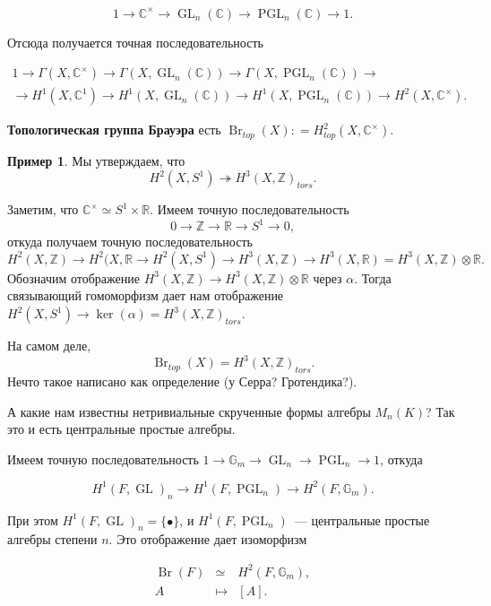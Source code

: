 \documentclass[a4paper]{article}
\DeclareMathOperator{\Br}{Br}
\DeclareMathOperator{\PGL}{PGL}
\DeclareMathOperator{\GL}{GL}
\newcommand{\term}{\textbf}
\newcommand{\dfn}{\mathrel{\mathop:}=}
\newcommand{\isom}{\simeq}
\theoremstyle{definition}
\newtheorem{example}[theorem]{Пример}
\begin{document}
\[ 1 \to \mathbb{C}^\times \to \GL_n (\mathbb{C}) \to \PGL_n (\mathbb{C}) \to 1. \]

Отсюда получается точная последовательность

\begin{gather*}
1 \to \Gamma (X, \mathbb{C}^\times) \to \Gamma (X, \GL_n (\mathbb{C}))
\to \Gamma (X, \PGL_n (\mathbb{C})) \to \\ \to H^1 (X,\mathbb{C}^1)
\to H^1 (X,\GL_n (\mathbb{C})) \to H^1 (X, \PGL_n (\mathbb{C})) \to
H^2 (X, \mathbb{C}^\times).
\end{gather*}

\term{Топологическая группа Брауэра} есть $\Br_{top} (X) \dfn
H^2_{top} (X, \mathbb{C}^\times)$.

\begin{example}
Мы утверждаем, что
\[ H^2 (X, S^1) \twoheadrightarrow H^3 (X, \mathbb{Z})_{tors}. \]

Заметим, что
$\mathbb{C}^\times \isom S^1 \times \mathbb{R}$. Имеем точную
последовательность 
\[ 0 \to \mathbb{Z} \to \mathbb{R} \to S^1 \to 0, \]
откуда получаем точную последовательность
\[ H^2(X,\mathbb{Z})\to H^2(X,\mathbb{R}\to H^2(X,S^1)\to
H^3(X,\mathbb Z)\to H^3(X,\mathbb R)=H^3(X,\mathbb Z)\otimes \mathbb R.\]
Обозначим отображение $H^3(X,\mathbb Z)\to H^3(X,\mathbb
Z)\otimes\mathbb R$ через $\alpha$. Тогда связывающий гомоморфизм
дает нам отображение $H^2(X,S^1)\to\ker(\alpha)=H^3(X,\mathbb Z)_{tors}$.

На самом деле,
\[ \Br_{top} (X) = H^3 (X,\mathbb{Z})_{tors}. \]
Нечто такое написано как определение (у Серра? Гротендика?).
\end{example}

А какие нам известны нетривиальные скрученные формы алгебры $M_n (K)$?
Так это и есть центральные простые алгебры.

Имеем точную последовательность $1 \to \mathbb{G}_m \to \GL_n \to
\PGL_n \to 1$, откуда

\[ H^1 (F,\GL)_n \to H^1 (F, \PGL_n) \to H^2 (F,\mathbb{G}_m). \]

При этом
$H^1 (F,\GL)_n = \{ \bullet \}$, и $H^1 (F, \PGL_n)$~--- центральные
простые алгебры степени $n$. Это отображение дает изоморфизм %

\begin{eqnarray*}
\Br (F) & \isom & H^2 (F,\mathbb{G}_m),\\
A & \mapsto & [A].
\end{eqnarray*}
\end{document}
